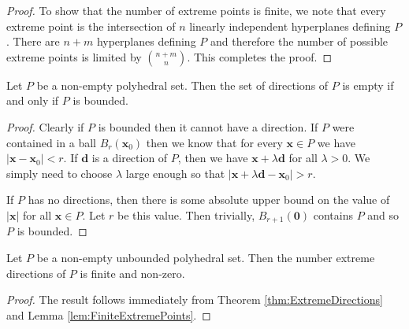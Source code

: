 \begin{proof}
To show that the number of extreme points is finite, we note that every extreme point is the intersection of $n$ linearly independent hyperplanes defining $P$. There are $n+m$ hyperplanes defining $P$ and therefore the number of possible extreme points is limited by $\binom{n+m}{n}$. This completes the proof.
\end{proof}

\begin{lemma} Let $P$ be a non-empty polyhedral set. Then the set of directions of $P$ is empty if and only if $P$ is bounded. 
\end{lemma}
\begin{proof} Clearly if $P$ is bounded then it cannot have a direction. If $P$ were contained in a ball $B_r(\mathbf{x}_0)$ then we know that for every $\mathbf{x} \in P$ we have $|\mathbf{x}-\mathbf{x}_0| < r$. If $\mathbf{d}$ is a direction of $P$, then we have $\mathbf{x} + \lambda\mathbf{d}$ for all $\lambda > 0$. We simply need to choose $\lambda$ large enough so that $|\mathbf{x} + \lambda\mathbf{d}-\mathbf{x}_0| > r$. 

If $P$ has no directions, then there is some absolute upper bound on the value of $|\mathbf{x}|$ for all $\mathbf{x} \in P$. Let $r$ be this value. Then trivially, $B_{r+1}(\mathbf{0})$ contains $P$ and so $P$ is bounded. 
\end{proof}

\begin{lemma} Let $P$ be a non-empty unbounded polyhedral set. Then the number extreme directions of $P$ is finite and non-zero.
\end{lemma}
\begin{proof} The result follows immediately from Theorem \ref{thm:ExtremeDirections} and Lemma \ref{lem:FiniteExtremePoints}. 
\end{proof}


